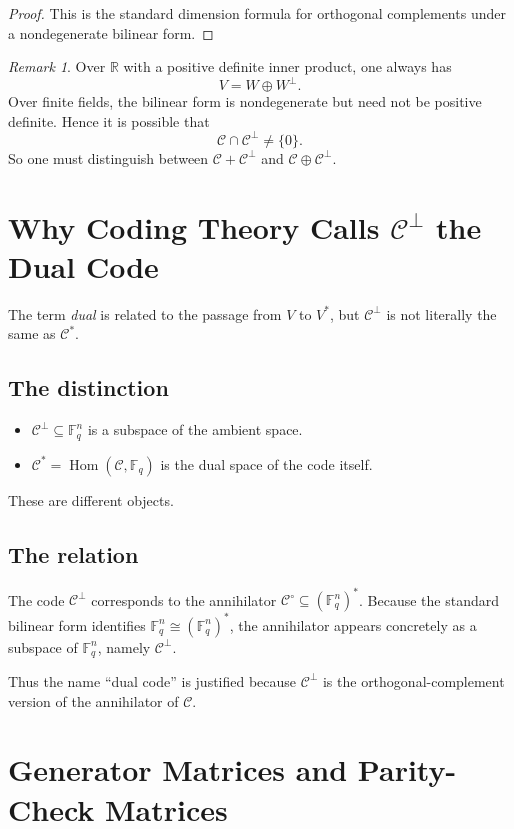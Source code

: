 \documentclass[11pt]{article}
\theoremstyle{remark}
\newtheorem{remark}{Remark}
\newcommand{\F}{\mathbb{F}}
\newcommand{\C}{\mathcal{C}}
\newcommand{\Cp}{\mathcal{C}^{\perp}}
\newcommand{\Hom}{\operatorname{Hom}}
\begin{document}
	\begin{proof}
		This is the standard dimension formula for orthogonal complements under a nondegenerate bilinear form.
	\end{proof}
	
	\begin{remark}
		Over \(\mathbb{R}\) with a positive definite inner product, one always has
		\[
		V = W \oplus W^\perp.
		\]
		Over finite fields, the bilinear form is nondegenerate but need not be positive definite. Hence it is possible that
		\[
		\C \cap \Cp \neq \{0\}.
		\]
		So one must distinguish between \(\C+\Cp\) and \(\C\oplus\Cp\).
	\end{remark}
	
	\section{Why Coding Theory Calls \(\C^\perp\) the Dual Code}
	
	The term \emph{dual} is related to the passage from \(V\) to \(V^*\), but \(\Cp\) is not literally the same as \(\C^*\).
	
	\subsection{The distinction}
	
	\begin{itemize}[leftmargin=2em]
		\item \(\Cp\subseteq \F_q^n\) is a subspace of the ambient space.
		\item \(\C^*=\Hom(\C,\F_q)\) is the dual space of the code itself.
	\end{itemize}
	
	These are different objects.
	
	\subsection{The relation}
	
	The code \(\Cp\) corresponds to the annihilator \(\C^\circ\subseteq (\F_q^n)^*\). Because the standard bilinear form identifies \(\F_q^n\cong(\F_q^n)^*\), the annihilator appears concretely as a subspace of \(\F_q^n\), namely \(\Cp\).
	
	Thus the name ``dual code'' is justified because \(\Cp\) is the orthogonal-complement version of the annihilator of \(\C\).
	
	\section{Generator Matrices and Parity-Check Matrices}
	
\end{document}
